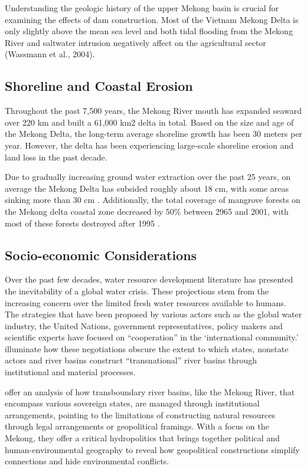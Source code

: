   
  Understanding the geologic history of the upper Mekong basin is crucial for examining the effects of dam construction. Most of the Vietnam Mekong Delta is only slightly above the mean sea level and both tidal flooding from the Mekong River and saltwater intrusion negatively affect on the agricultural sector (Wassmann et al., 2004). 

\subsection{Shoreline and Coastal Erosion}

Throughout the past 7,500 years, the Mekong River mouth has expanded seaward over 220 km and built a 61,000 km2 delta in total. Based on the size and age of the Mekong Delta, the long-term average shoreline growth has been 30 meters per year. However, the delta has been experiencing large-scale shoreline erosion and land loss in the past decade. 
  
Due to gradually increasing ground water extraction over the past 25 years, on average the Mekong Delta has subsided roughly about 18 cm, with some areas sinking more than 30 cm \citep{erban2014groundwater, minderhoud2017impacts}. Additionally, the total coverage of mangrove forests on the Mekong delta coastal zone decreased by 50\% between 2965 and 2001, with most of these forests destroyed after 1995 \citep{thu2007status}.

\subsection{Socio-economic Considerations}

Over the past few decades, water resource development literature has presented the inevitability of a global water crisis. These projections stem from the increasing concern over the limited fresh water resources available to humans.  The strategies that have been proposed by various actors such as the global water industry, the United Nations, government representatives, policy makers and scientific experts have focused on ``cooperation'' in the `international community.' \citet{sneddon2006rethinking} illuminate how these negotiations obscure the extent to which states, nonstate actors and river basins construct ``transnational'' river basins through institutional and material processes.
  
\citet{sneddon2006rethinking} offer an analysis of how transboundary river basins, like the Mekong River, that encompass various sovereign states, are managed through institutional arrangements, pointing to the limitations of constructing natural resources through legal arrangements or geopolitical framings. With a focus on the Mekong, they offer a critical hydropolitics that brings together political and human-environmental geography to reveal how geopolitical constructions simplify connections and hide environmental conflicts. 

